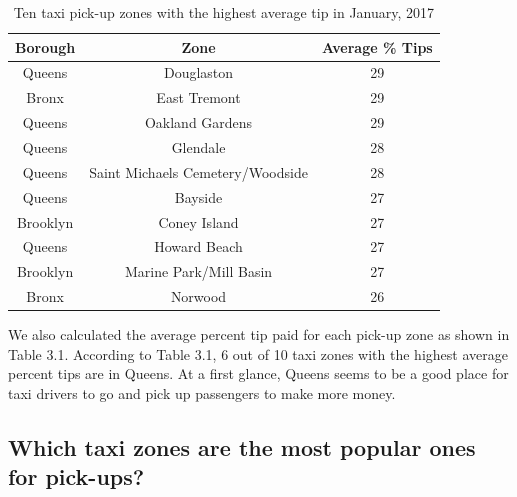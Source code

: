 \documentclass[12pt,twoside]{reedthesis}
\theoremstyle{definition}
\theoremstyle{definition}
\theoremstyle{definition}
\theoremstyle{remark}
\begin{document}
\begin{table}

\caption{\label{tab:unnamed-chunk-39}Ten taxi pick-up zones with the highest average tip in January, 2017}
\centering
\begin{tabular}[t]{ccc}
\toprule
Borough & Zone & Average \% Tips\\
\midrule
Queens & Douglaston & 29\\
Bronx & East Tremont & 29\\
Queens & Oakland Gardens & 29\\
Queens & Glendale & 28\\
Queens & Saint Michaels Cemetery/Woodside & 28\\
\addlinespace
Queens & Bayside & 27\\
Brooklyn & Coney Island & 27\\
Queens & Howard Beach & 27\\
Brooklyn & Marine Park/Mill Basin & 27\\
Bronx & Norwood & 26\\
\bottomrule
\end{tabular}
\end{table}
We also calculated the average percent tip paid for each pick-up zone as
shown in Table 3.1. According to Table 3.1, 6 out of 10 taxi zones with
the highest average percent tips are in Queens. At a first glance,
Queens seems to be a good place for taxi drivers to go and pick up
passengers to make more money.

\subsection{Which taxi zones are the most popular ones for
pick-ups?}\label{which-taxi-zones-are-the-most-popular-ones-for-pick-ups}
\end{document}
